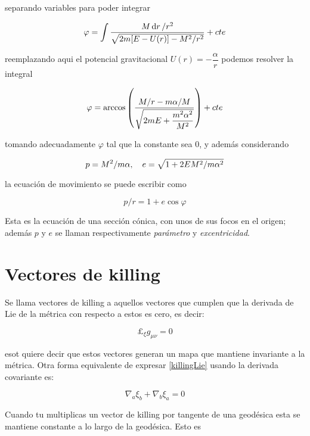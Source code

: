 \documentclass[../Main.tex]{subfiles}
\begin{document}
separando variables para poder integrar

\begin{equation}
    \varphi = \int \dfrac{M\dd{r}/r^{2}}{\sqrt{2m\qty[E-U(r)]-M^{2}/r^{2}}} + cte
\end{equation}

reemplazando aqui el potencial gravitacional $U(r) = -\dfrac{\alpha}{r}$ podemos resolver la integral

\begin{equation}
    \varphi = \arccos{\qty(\dfrac{M/r-m\alpha/M}{\sqrt{2mE+\dfrac{m^{2}\alpha^{2}}{M^{2}}}})} + cte
\end{equation}

tomando adecuadamente $\varphi$ tal que la constante sea 0, y además considerando 

\begin{equation}
    p = M^{2}/m\alpha \qc e=\sqrt{1+2EM^{2}/m\alpha^{2}}
\end{equation}

la ecuación de movimiento se puede escribir como

\begin{equation}
    p/r = 1 + e \cos{\varphi}
\end{equation}

Esta es la ecuación de una sección cónica, con unos de sus focos en el origen; además $p$ y $e$ se llaman respectivamente \textit{parámetro} y \textit{excentricidad}.

\section{Vectores de killing}\label{sec:killing}
Se llama vectores de killing a aquellos vectores que cumplen que la derivada de Lie de la métrica con respecto a estos es cero, es decir:

\begin{equation}
    \pounds_{\xi}g_{\mu\nu} = 0
    \label{killingLie}
\end{equation}

esot quiere decir que estos vectores generan un mapa que mantiene invariante a la métrica. Otra forma equivalente de expresar \eqref{killingLie} usando la derivada covariante es:

\begin{equation}
    \nabla_{a}\xi_{b} + \nabla_{b}\xi_{a} = 0
\end{equation}

Cuando tu multiplicas un vector de killing por tangente de una geodésica esta se mantiene constante a lo largo de la geodésica. Esto es
\end{document}
